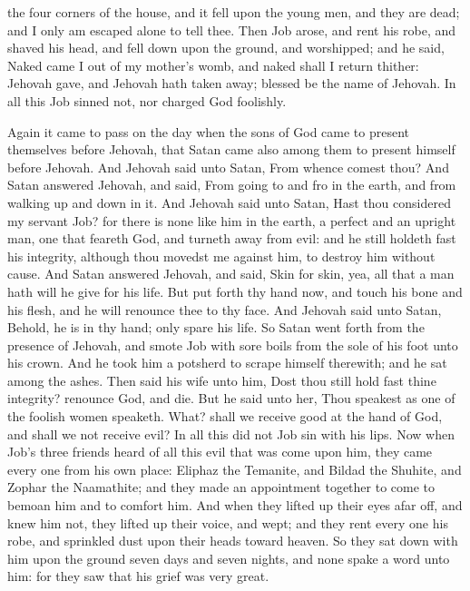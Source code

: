 the four corners of the house, and it fell upon the young men, and they are dead; and I only am escaped alone to tell thee.  Then Job arose, and rent his robe, and shaved his head, and fell down upon the ground, and worshipped; and he said, Naked came I out of my mother’s womb, and naked shall I return thither: Jehovah gave, and Jehovah hath taken away; blessed be the name of Jehovah. In all this Job sinned not, nor charged God foolishly. 

Again it came to pass on the day when the sons of God came to present themselves before Jehovah, that Satan came also among them to present himself before Jehovah. And Jehovah said unto Satan, From whence comest thou? And Satan answered Jehovah, and said, From going to and fro in the earth, and from walking up and down in it. And Jehovah said unto Satan, Hast thou considered my servant Job? for there is none like him in the earth, a perfect and an upright man, one that feareth God, and turneth away from evil: and he still holdeth fast his integrity, although thou movedst me against him, to destroy him without cause. And Satan answered Jehovah, and said, Skin for skin, yea, all that a man hath will he give for his life. But put forth thy hand now, and touch his bone and his flesh, and he will renounce thee to thy face. And Jehovah said unto Satan, Behold, he is in thy hand; only spare his life.  So Satan went forth from the presence of Jehovah, and smote Job with sore boils from the sole of his foot unto his crown. And he took him a potsherd to scrape himself therewith; and he sat among the ashes. Then said his wife unto him, Dost thou still hold fast thine integrity? renounce God, and die. But he said unto her, Thou speakest as one of the foolish women speaketh. What? shall we receive good at the hand of God, and shall we not receive evil? In all this did not Job sin with his lips.  Now when Job’s three friends heard of all this evil that was come upon him, they came every one from his own place: Eliphaz the Temanite, and Bildad the Shuhite, and Zophar the Naamathite; and they made an appointment together to come to bemoan him and to comfort him. And when they lifted up their eyes afar off, and knew him not, they lifted up their voice, and wept; and they rent every one his robe, and sprinkled dust upon their heads toward heaven. So they sat down with him upon the ground seven days and seven nights, and none spake a word unto him: for they saw that his grief was very great. 

